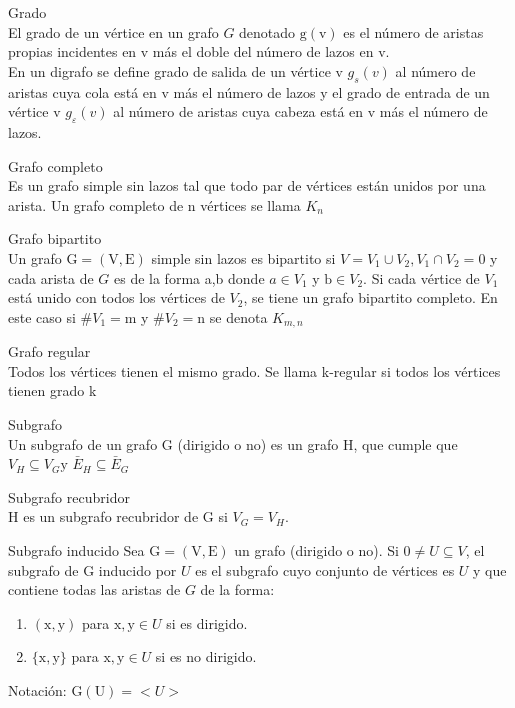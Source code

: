 \documentclass{article}
\begin{document}
\begin{defn}
Grado \\ El grado de un vértice en un grafo $G$ denotado $\mathrm{g}(\mathrm{v})$ es el número de aristas propias incidentes en v más el doble del número de lazos en v. \\ En un digrafo se define grado de salida de un vértice v $g_{s}(v)$ al número de aristas cuya cola está en v más el número de lazos y el grado de entrada de un vértice v $g_{\varepsilon}(v)$ al número de aristas cuya cabeza está en $\mathrm{v}$ más el número de lazos.
\end{defn}

\begin{defn}
Grafo completo \\ Es un grafo simple sin lazos tal que todo par de vértices están unidos por una arista. Un grafo completo de n vértices se llama $K_{n}$
\end{defn}

\begin{defn}
Grafo bipartito \\ Un grafo $\mathrm{G}=(\mathrm{V}, \mathrm{E})$ simple sin lazos es bipartito si $V=V_{1} \cup V_{2}, V_{1} \cap V_{2}=0$ y cada arista de $G$ es de la forma a,b donde $a \in V_{1}$ y $\mathrm{b} \in V_{2}$. Si cada vértice de $V_{1}$ está unido con todos los vértices de $V_{2}$, se tiene un grafo bipartito completo. En este caso si $\# V_{1}=\mathrm{m}$ y $\#V_{2}=\mathrm{n}$ se denota $K_{m, n}$
\end{defn}

\begin{defn}
Grafo regular \\ Todos los vértices tienen el mismo grado. Se llama k-regular si todos los vértices tienen grado k
\end{defn}

\begin{defn}
Subgrafo \\ Un subgrafo de un grafo G (dirigido o no) es un grafo $\mathrm{H}$, que cumple que $V_{H} \subseteq V_{G} \mathrm{y}$ $\bar{E}_{H} \subseteq \bar{E}_{G}$
\end{defn}

\begin{defn}
Subgrafo recubridor \\ $\mathrm{H}$ es un subgrafo recubridor de $\mathrm{G}$ si $V_{G}=V_{H} .$
\end{defn}

\begin{defn}
Subgrafo inducido Sea $\mathrm{G}=(\mathrm{V}, \mathrm{E})$ un grafo (dirigido o no). Si $0 \neq U \subseteq V$, el subgrafo de $\mathrm{G}$ inducido por $U$ es el subgrafo cuyo conjunto de vértices es $U$ y que contiene todas las aristas de $G$ de la forma: 
\begin{enumerate}
    \item $(\mathrm{x}, \mathrm{y})$ para $\mathrm{x}, \mathrm{y} \in U$ si es dirigido.
    \item $\{\mathrm{x}, \mathrm{y}\}$ para $\mathrm{x}, \mathrm{y} \in U$ si es no dirigido.
\end{enumerate}
Notación: $\mathrm{G}(\mathrm{U})=<U>$
\end{defn}
\end{document}
